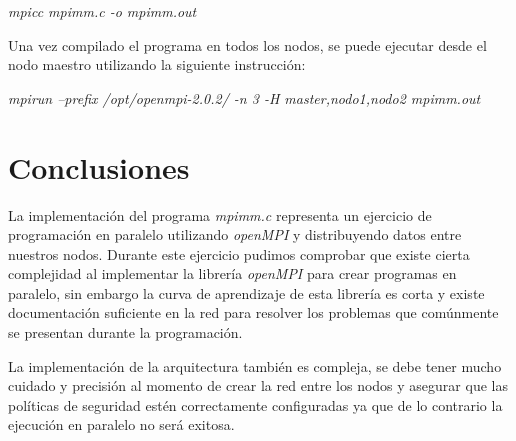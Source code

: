 \documentclass[DIV=calc, paper=letter, fontsize=11pt, twocolumn]{scrartcl}
\begin{document}
\textit{mpicc mpimm.c -o mpimm.out}

Una vez compilado el programa en todos los nodos, se puede ejecutar desde el nodo maestro utilizando la siguiente instrucción:

\textit{mpirun --prefix /opt/openmpi-2.0.2/ -n 3 -H master,nodo1,nodo2 mpimm.out}

\section{Conclusiones}
La implementación del programa \textit{mpimm.c} representa un ejercicio de programación en paralelo utilizando \textit{openMPI} y distribuyendo datos entre nuestros nodos.
Durante este ejercicio pudimos comprobar que existe cierta complejidad al implementar la librería \textit{openMPI} para crear programas en paralelo, sin embargo la curva de aprendizaje de esta librería es corta y existe documentación suficiente en la red para resolver los problemas que comúnmente se presentan durante la programación.

La implementación de la arquitectura también es compleja, se debe tener mucho cuidado y precisión al momento de crear la red entre los nodos y asegurar que las políticas de seguridad estén correctamente configuradas ya que de lo contrario la ejecución en paralelo no será exitosa.
\end{document}
